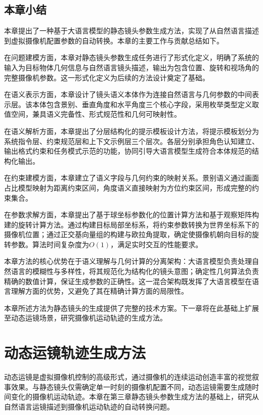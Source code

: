 \section{本章小结}

本章提出了一种基于大语言模型的静态镜头参数生成方法，实现了从自然语言描述到虚拟摄像机配置参数的自动转换。本章的主要工作与贡献总结如下。

在问题建模方面，本章对静态镜头参数生成任务进行了形式化定义，明确了系统的输入为目标物体几何信息与自然语言镜头描述，输出为包含位置、旋转和视场角的完整摄像机参数。这一形式化定义为后续的方法设计奠定了基础。

在语义表示方面，本章设计了镜头语义本体作为连接自然语言与几何参数的中间表示层。该本体包含景别、垂直角度和水平角度三个核心字段，采用枚举类型定义取值空间，兼具语义完备性、形式规范性和几何可映射性。

在语义解析方面，本章提出了分层结构化的提示模板设计方法，将提示模板划分为系统指令层、约束规范层和上下文示例层三个层次。各层分别承担角色认知建立、输出格式约束和任务模式示范的功能，协同引导大语言模型生成符合本体规范的结构化输出。

在约束建模方面，本章建立了语义字段与几何约束的映射关系。景别语义通过画面占比模型映射为距离约束区间，角度语义直接映射为方位约束区间，形成完整的约束集合。

在参数求解方面，本章提出了基于球坐标参数化的位置计算方法和基于观察矩阵构建的旋转计算方法。通过构建目标局部坐标系，将约束参数转换为世界坐标系下的摄像机位置；通过正交基向量组的构建与欧拉角提取，确定使摄像机朝向目标的旋转参数。算法时间复杂度为$O(1)$，满足实时交互的性能要求。

本章方法的核心优势在于语义理解与几何计算的分离架构：大语言模型负责处理自然语言的模糊性与多样性，将其规范化为结构化的镜头意图；确定性几何算法负责精确的数值计算，保证生成参数的正确性。这一混合架构既发挥了大语言模型在语言理解方面的优势，又避免了其在精确计算方面的局限性。

本章所述方法为静态镜头的生成提供了完整的技术方案。下一章将在此基础上扩展至动态运镜场景，研究摄像机运动轨迹的生成方法。


\chapter{动态运镜轨迹生成方法}

动态运镜是虚拟摄像机控制的高级形式，通过摄像机的连续运动创造丰富的视觉叙事效果。与静态镜头仅需确定单一时刻的摄像机配置不同，动态运镜需要生成随时间变化的摄像机运动轨迹。本章在第三章静态镜头参数生成方法的基础上，研究从自然语言运镜描述到摄像机运动轨迹的自动转换问题。


